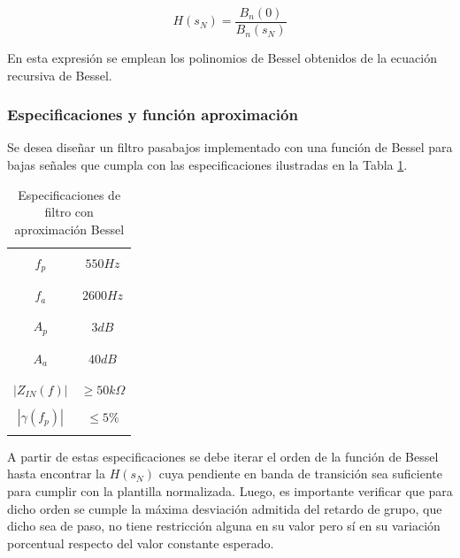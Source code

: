 \begin{equation}
    H(s_N) = \frac{B_n(0)}{B_n(s_N)}
\end{equation}

En esta expresi\'on se emplean los polinomios de Bessel obtenidos de la ecuaci\'on recursiva de Bessel.

\subsubsection{Especificaciones y funci\'on aproximaci\'on}
Se desea dise\~nar un filtro pasabajos implementado con una funci\'on de Bessel para bajas se\~nales que cumpla con las especificaciones ilustradas
en la Tabla \ref{table:especificaciones_bessel}.

\begin{table}[H]
    \centering
    \begin{tabular}{c | c}
        \hline \\
        $f_p$ & $550Hz$ \\
        \\ \hline \\
        $f_a$ & $2600Hz$ \\
        \\ \hline \\
        $A_p$ & $3 dB$ \\
        \\ \hline \\
        $A_a$ & $40 dB$ \\
        \\ \hline \\
        $|Z_{IN}(f)|$ & $\geq 50k \Omega$ \\ 
        \\ \hline
        $|\gamma(f_p)|$ & $\leq 5 \% $ \\ 
        \\ \hline
    \end{tabular}
    \caption{Especificaciones de filtro con aproximaci\'on Bessel}
    \label{table:especificaciones_bessel}
\end{table}

A partir de estas especificaciones se debe iterar el orden de la funci\'on de Bessel hasta encontrar la $H(s_N)$ cuya pendiente en banda de transici\'on sea suficiente para cumplir con la plantilla
normalizada. Luego, es importante verificar que para dicho orden se cumple la m\'axima desviaci\'on admitida del retardo de grupo, que dicho sea de paso, no tiene restricci\'on alguna en su valor pero s\'i
en su variaci\'on porcentual respecto del valor constante esperado.


